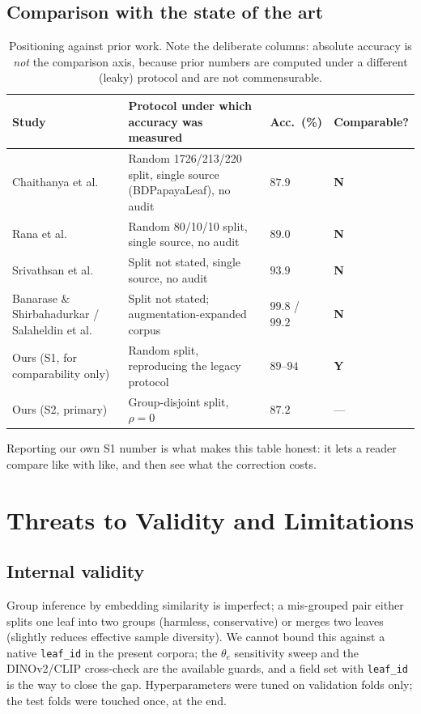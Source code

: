 \documentclass[10pt,twocolumn,a4paper]{article}
\newcommand{\cmark}{\textcolor{leafgreen}{\textbf{Y}}}
\newcommand{\xmark}{\textcolor{tbdred}{\textbf{N}}}
\begin{document}
\subsection{Comparison with the state of the art}
\begin{table}[H]
\centering
\caption{Positioning against prior work. Note the deliberate columns: absolute accuracy is \emph{not} the comparison axis, because prior numbers are computed under a different (leaky) protocol and are not commensurable.}
\label{tab:sota}
{\footnotesize
\begin{tabularx}{\columnwidth}{@{}p{1.5cm} X p{1.0cm} p{1.1cm}@{}}
\toprule
\rowcolor{hdrgray}
Study & Protocol under which accuracy was measured & Acc.\ (\%) & Comparable? \\
\midrule
Chaithanya et al.\ \cite{chaithanya2023} & Random 1726/213/220 split, single source (BDPapayaLeaf), no audit & $87.9$ & \xmark \\
Rana et al.\ \cite{rana2026} & Random 80/10/10 split, single source, no audit & $89.0$ & \xmark \\
Srivathsan et al.\ \cite{srivathsan2026} & Split not stated, single source, no audit & $93.9$ & \xmark \\
Banarase \& Shirbahadurkar \cite{banarase2024} / Salaheldin et al.\ \cite{salaheldin2026} & Split not stated; augmentation-expanded corpus & $99.8$ / $99.2$ & \xmark \\
\rowcolor{boxbg} Ours (S1, for comparability only) & Random split, reproducing the legacy protocol & $89$--$94$ & \cmark \\
\rowcolor{boxbg} Ours (S2, primary) & Group-disjoint split, $\rho=0$ & $87.2$ & --- \\
\bottomrule
\end{tabularx}}
\end{table}
Reporting our own S1 number is what makes this table honest: it lets a reader compare like with like, and then see what the correction costs.

\section{Threats to Validity and Limitations}
\label{sec:threats}

\subsection{Internal validity}
Group inference by embedding similarity is imperfect; a mis-grouped pair either splits one leaf into two groups (harmless, conservative) or merges two leaves (slightly reduces effective sample diversity). We cannot bound this against a native \texttt{leaf\_id} in the present corpora; the $\theta_e$ sensitivity sweep and the DINOv2/CLIP cross-check are the available guards, and a field set with \texttt{leaf\_id} is the way to close the gap. Hyperparameters were tuned on validation folds only; the test folds were touched once, at the end.
\end{document}
